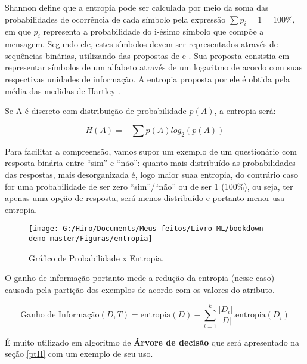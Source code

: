 \documentclass[
]{book}
\begin{document}
Shannon define que a entropia pode ser calculada por meio da soma das probabilidades de ocorrência de cada símbolo pela expressão \(∑ p_i = 1 = 100\%\), em que \(p_i\) representa a probabilidade do i-ésimo símbolo que compõe a mensagem. Segundo ele, estes símbolos devem ser representados através de sequências binárias, utilizando das propostas de \citet{nyquist1924certain} e \citet{hartley1928transmission}. Sua proposta consistia em representar símbolos de um alfabeto através de um logaritmo de acordo com suas respectivas unidades de informação. A entropia proposta por ele é obtida pela média das medidas de Hartley \citep{moser2012student}.

Se A é discreto com distribuição de probabilidade \(p(A)\), a entropia será:

\begin{equation} 
  H(A)=- \sum p(A)log_2(p(A)) 
  \label{eq:entropia}
\end{equation}

Para facilitar a compreensão, vamos supor um exemplo de um questionário com resposta binária entre ``sim'' e ``não'': quanto mais distribuído as probabilidades das respostas, mais desorganizada é, logo maior suaa entropia, do contrário caso for uma probabilidade de ser zero ``sim''/``não'' ou de ser 1 (100\%), ou seja, ter apenas uma opção de resposta, será menos distribuído e portanto menor usa entropia.

\begin{figure}

{\centering \texttt{[image: G:/Hiro/Documents/Meus feitos/Livro ML/bookdown-demo-master/Figuras/entropia]} 

}

\caption{Gráfico de Probabilidade x Entropia.}\label{fig:entropia}
\end{figure}



O ganho de informação portanto mede a redução da entropia (nesse caso) causada pela partição dos exemplos de acordo com os valores do atributo.

\begin{equation} 
  \mbox{Ganho de Informação}(D,T)=\mbox{entropia}(D)-\displaystyle \sum_{i=1}^k \frac{|D_i|}{|D|}. \mbox{entropia}(D_i) 
  \label{eq:ganhodeinf}
\end{equation}

É muito utilizado em algoritmo de \textbf{Árvore de decisão} que será apresentado na seção \ref{ptII} com um exemplo de seu uso.
\end{document}
